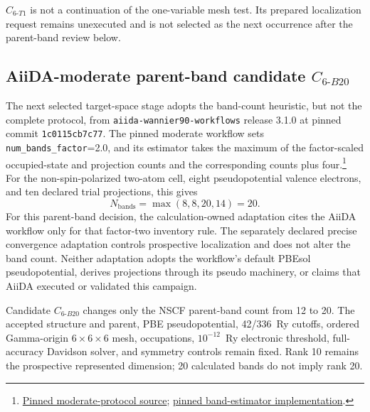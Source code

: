 \documentclass[11pt]{article}
\begin{document}
$C_{6\text{-}T1}$ is not a continuation of the one-variable mesh test.  Its prepared
localization request remains unexecuted and is not selected as the next occurrence after
the parent-band review below.

\subsection{AiiDA-moderate parent-band candidate
\texorpdfstring{$C_{6\text{-}B20}$}{C6-B20}}

The next selected target-space stage adopts the band-count heuristic, but not the
complete protocol, from \texttt{aiida-wannier90-workflows} release 3.1.0 at pinned
commit \texttt{1c0115cb7c77}.  The pinned moderate
workflow sets \texttt{num\_bands\_factor}=2.0, and its estimator takes the maximum of
the factor-scaled occupied-state and projection counts and the corresponding counts
plus four.\footnote{\href{https://github.com/aiidateam/aiida-wannier90-workflows/blob/1c0115cb7c77541a0bd549bc05005df435d651b6/src/aiida_wannier90_workflows/workflows/protocols/base/wannier90.yaml\#L6-L25}{Pinned moderate-protocol source};
\href{https://github.com/aiidateam/aiida-wannier90-workflows/blob/1c0115cb7c77541a0bd549bc05005df435d651b6/src/aiida_wannier90_workflows/utils/pseudo/__init__.py\#L292-L342}{pinned band-estimator implementation}.}
For the non-spin-polarized two-atom cell, eight pseudopotential valence electrons, and
ten declared trial projections, this gives
\begin{equation}
  N_{\mathrm{bands}}=\max(8,8,20,14)=20.
\end{equation}
For this parent-band decision, the calculation-owned adaptation cites the AiiDA
workflow only for that factor-two inventory rule.  The separately declared precise
convergence adaptation controls prospective localization and does not alter the band
count.  Neither adaptation adopts the workflow's default PBEsol pseudopotential,
derives projections through its pseudo machinery, or claims that AiiDA executed or
validated this campaign.

Candidate $C_{6\text{-}B20}$ changes only the NSCF parent-band count from 12 to 20.
The accepted structure and parent, PBE pseudopotential, 42/336~Ry cutoffs, ordered
Gamma-origin $6\times6\times6$ mesh, occupations, $10^{-12}$~Ry electronic threshold,
full-accuracy Davidson solver, and symmetry controls remain fixed.  Rank 10 remains the
prospective represented dimension; 20 calculated bands do not imply rank 20.
\end{document}
